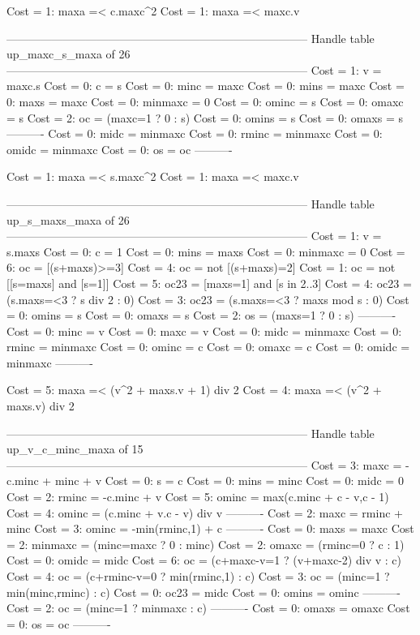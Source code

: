 Cost =  1:  maxa =< c.maxc^2
Cost =  1:  maxa =< maxc.v

--------------------------------------------------------------------------------
Handle table up_maxc_s_maxa of 26
--------------------------------------------------------------------------------
Cost =  1:  v       = maxc.s
Cost =  0:  c       = s
Cost =  0:  minc    = maxc
Cost =  0:  mins    = maxc
Cost =  0:  maxs    = maxc
Cost =  0:  minmaxc = 0
Cost =  0:  ominc   = s
Cost =  0:  omaxc   = s
Cost =  2:  oc      = (maxc=1 ? 0 : s)
Cost =  0:  omins   = s
Cost =  0:  omaxs   = s
----------
Cost =  0:  midc    = minmaxc
Cost =  0:  rminc   = minmaxc
Cost =  0:  omidc   = minmaxc
Cost =  0:  os      = oc
----------

Cost =  1:  maxa =< s.maxc^2
Cost =  1:  maxa =< maxc.v

--------------------------------------------------------------------------------
Handle table up_s_maxs_maxa of 26
--------------------------------------------------------------------------------
Cost =  1:  v       = s.maxs
Cost =  0:  c       = 1
Cost =  0:  mins    = maxs
Cost =  0:  minmaxc = 0
Cost =  6:  oc      = [(s+maxs)>=3]
Cost =  4:  oc      = not [(s+maxs)=2]
Cost =  1:  oc      = not [[s=maxs] and [s=1]]
Cost =  5:  oc23    = [maxs=1] and [s in 2..3]
Cost =  4:  oc23    = (s.maxs=<3 ? s div 2 : 0)
Cost =  3:  oc23    = (s.maxs=<3 ? maxs mod s : 0)
Cost =  0:  omins   = s
Cost =  0:  omaxs   = s
Cost =  2:  os      = (maxs=1 ? 0 : s)
----------
Cost =  0:  minc    = v
Cost =  0:  maxc    = v
Cost =  0:  midc    = minmaxc
Cost =  0:  rminc   = minmaxc
Cost =  0:  ominc   = c
Cost =  0:  omaxc   = c
Cost =  0:  omidc   = minmaxc
----------

Cost =  5:  maxa =< (v^2 + maxs.v + 1) div 2
Cost =  4:  maxa =< (v^2 + maxs.v) div 2

--------------------------------------------------------------------------------
Handle table up_v_c_minc_maxa of 15
--------------------------------------------------------------------------------
Cost =  3:  maxc    = -c.minc + minc + v
Cost =  0:  s       = c
Cost =  0:  mins    = minc
Cost =  0:  midc    = 0
Cost =  2:  rminc   = -c.minc + v
Cost =  5:  ominc   = max(c.minc + c - v,c - 1)
Cost =  4:  ominc   = (c.minc + v.c - v) div v
----------
Cost =  2:  maxc    = rminc + minc
Cost =  3:  ominc   = -min(rminc,1) + c
----------
Cost =  0:  maxs    = maxc
Cost =  2:  minmaxc = (minc=maxc ? 0 : minc)
Cost =  2:  omaxc   = (rminc=0 ? c : 1)
Cost =  0:  omidc   = midc
Cost =  6:  oc      = (c+maxc-v=1 ? (v+maxc-2) div v : c)
Cost =  4:  oc      = (c+rminc-v=0 ? min(rminc,1) : c)
Cost =  3:  oc      = (minc=1 ? min(minc,rminc) : c)
Cost =  0:  oc23    = midc
Cost =  0:  omins   = ominc
----------
Cost =  2:  oc      = (minc=1 ? minmaxc : c)
----------
Cost =  0:  omaxs   = omaxc
Cost =  0:  os      = oc
----------

